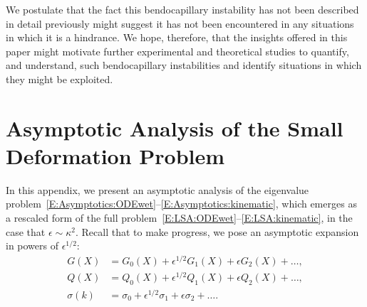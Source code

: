 \documentclass{jfm}
\begin{document}
We postulate that the fact this bendocapillary instability has not been described in detail previously might suggest it has not been encountered in any situations in which it is a hindrance. We hope, therefore, that the insights offered in this paper might motivate further experimental and theoretical studies to quantify, and understand, such bendocapillary instabilities and identify situations in which they might be exploited. 



\appendix
\section{Asymptotic Analysis of the Small Deformation Problem}\label{A:SmallDeformationAsymptotics}
In this appendix, we present an asymptotic analysis of the eigenvalue problem~\eqref{E:Asymptotics:ODEwet}--\eqref{E:Asymptotics:kinematic}, which emerges as a rescaled form of the full problem~\eqref{E:LSA:ODEwet}--\eqref{E:LSA:kinematic}, in the case that $\epsilon \sim \kappa^2$. Recall that to make progress, we pose an asymptotic expansion in powers of $\epsilon^{1/2}$:
\begin{align}
G(X) &=    G_0(X) + \epsilon^{1/2} G_1(X) + \epsilon G_2(X)+ \dots, \label{A:E:G_expansion}\\
Q(X) &=  Q_0(X) + \epsilon^{1/2} Q_1(X) + \epsilon Q_2(X)+\dots,\label{A:E:Q_expansion}\\
\sigma(k) &= \sigma_0 + \epsilon^{1/2} \sigma_1 + \epsilon \sigma_2+ \dots. \label{A:E:sigma_expansion}
\end{align}
\end{document}
